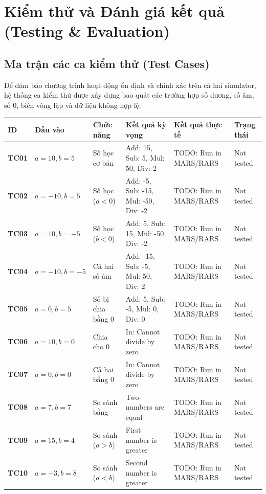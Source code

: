 \documentclass[12pt,a4paper]{article}
\begin{document}
\section{Kiểm thử và Đánh giá kết quả (Testing \& Evaluation)}

\subsection{Ma trận các ca kiểm thử (Test Cases)}
Để đảm bảo chương trình hoạt động ổn định và chính xác trên cả hai simulator, hệ thống ca kiểm thử được xây dựng bao quát các trường hợp số dương, số âm, số 0, biên vòng lặp và dữ liệu không hợp lệ:

\begin{table}[H]
    \centering
    \footnotesize
    \begin{tabularx}{\textwidth}{llllXX}
        \toprule
        \textbf{ID} & \textbf{Đầu vào} & \textbf{Chức năng} & \textbf{Kết quả kỳ vọng} & \textbf{Kết quả thực tế} & \textbf{Trạng thái} \\
        \midrule
        \textbf{TC01} & $a=10, b=5$ & Số học cơ bản & Add: 15, Sub: 5, Mul: 50, Div: 2 & TODO: Run in MARS/RARS & Not tested \\
        \textbf{TC02} & $a=-10, b=5$ & Số học ($a < 0$) & Add: -5, Sub: -15, Mul: -50, Div: -2 & TODO: Run in MARS/RARS & Not tested \\
        \textbf{TC03} & $a=10, b=-5$ & Số học ($b < 0$) & Add: 5, Sub: 15, Mul: -50, Div: -2 & TODO: Run in MARS/RARS & Not tested \\
        \textbf{TC04} & $a=-10, b=-5$ & Cả hai số âm & Add: -15, Sub: -5, Mul: 50, Div: 2 & TODO: Run in MARS/RARS & Not tested \\
        \textbf{TC05} & $a=0, b=5$ & Số bị chia bằng 0 & Add: 5, Sub: -5, Mul: 0, Div: 0 & TODO: Run in MARS/RARS & Not tested \\
        \textbf{TC06} & $a=10, b=0$ & Chia cho 0 & In: Cannot divide by zero & TODO: Run in MARS/RARS & Not tested \\
        \textbf{TC07} & $a=0, b=0$ & Cả hai bằng 0 & In: Cannot divide by zero & TODO: Run in MARS/RARS & Not tested \\
        \textbf{TC08} & $a=7, b=7$ & So sánh bằng & Two numbers are equal & TODO: Run in MARS/RARS & Not tested \\
        \textbf{TC09} & $a=15, b=4$ & So sánh ($a > b$) & First number is greater & TODO: Run in MARS/RARS & Not tested \\
        \textbf{TC10} & $a=-3, b=8$ & So sánh ($a < b$) & Second number is greater & TODO: Run in MARS/RARS & Not tested \\

\end{tabularx}
\end{table}
\end{document}
